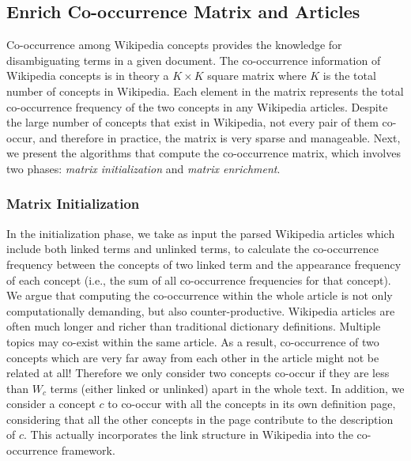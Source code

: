 \subsection{Enrich Co-occurrence Matrix and Articles}
\label{sec:enrich}


Co-occurrence among Wikipedia concepts provides
the knowledge for disambiguating terms in a given document.
The co-occurrence information of Wikipedia concepts is in theory
a $K \times K$ square matrix where $K$ is the total number of concepts in
Wikipedia. Each element in the matrix represents
the total co-occurrence frequency of the two concepts in
any Wikipedia articles.
Despite the large number of concepts that exist in Wikipedia, not every pair of
them co-occur, and therefore in practice, the matrix is very sparse and
manageable. Next, we present the algorithms that compute the co-occurrence
matrix, which involves two phases: {\em matrix initialization} and
{\em matrix enrichment}.

\subsubsection{Matrix Initialization}
In the initialization phase, we take as input the parsed Wikipedia articles
which include both linked terms and unlinked terms,
to calculate the co-occurrence frequency between the concepts of two linked
term and the appearance frequency of each concept
(i.e., the sum of all co-occurrence frequencies for that concept).
We argue that computing the co-occurrence within the whole article is not
only computationally demanding, but also counter-productive.
Wikipedia articles are often much longer and richer than
traditional dictionary definitions. Multiple topics may co-exist within
the same article. As a result, co-occurrence of two concepts which are very far
away from each other in the article might not be related at all!
Therefore we only consider two concepts co-occur if they are
less than $W_c$ terms (either linked or unlinked) apart in the whole text.
In addition, we consider a concept $c$ to co-occur with all the concepts
in its own definition page, considering that all the other concepts in the page contribute
to the description of $c$. This actually incorporates the link structure
in Wikipedia into the co-occurrence framework.

